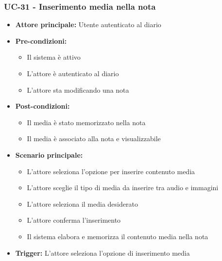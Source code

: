 \documentclass[a4paper,12pt]{article}
\begin{document}
\subsubsection{UC-31 - Inserimento media nella nota} \label{subsec:UC-31}
\begin{itemize}
    \item \textbf{Attore principale:} Utente autenticato al diario
    \item \textbf{Pre-condizioni:}
    \begin{itemize}
        \item Il sistema è attivo
        \item L'attore è autenticato al diario
        \item L'attore sta modificando una nota
    \end{itemize}
    \item \textbf{Post-condizioni:} 
    \begin{itemize}
        \item Il media è stato memorizzato nella nota
        \item Il media è associato alla nota e visualizzabile
    \end{itemize}
    \item \textbf{Scenario principale:} 
    \begin{itemize}
        \item L'attore seleziona l'opzione per inserire contenuto media
        \item L'attore sceglie il tipo di media da inserire tra audio e immagini
        \item L'attore seleziona il media desiderato
        \item L'attore conferma l'inserimento
        \item Il sistema elabora e memorizza il contenuto media nella nota
    \end{itemize}
    \item \textbf{Trigger:} L'attore seleziona l'opzione di inserimento media
\end{itemize}
\end{document}
